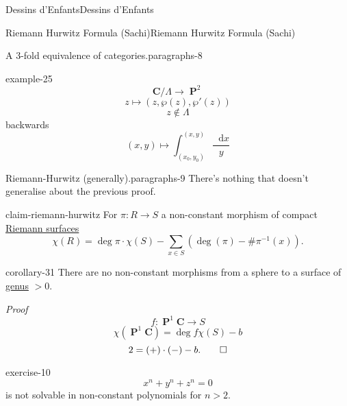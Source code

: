 \documentclass[10pt,]{book}
\makeatletter
\renewcommand*{\proofname}{Proof}
\renewenvironment{proof}[1][\proofname]{\par
  \pushQED{\qed}%
  \normalfont \topsep6\p@\@plus6\p@\relax
  \trivlist
  \item\relax
    {\itshape
    #1\@addpunct{.}}\hspace\labelsep\ignorespaces
}{%
  \popQED\endtrivlist\@endpefalse
}
\numberwithin{equation}{section}
\newcommand{\diff}{\mathop{}\!\mathrm{d}}
\newcommand{\inv}{^{-1}}
\newcommand{\CC}{\mathbf{C}}
\DeclareMathOperator{\PP}{\mathbf{P}}
\newcommand{\gt}{>}
\makeatother
\begin{document}
\begin{chapterptx}{Dessins d'Enfants}{}{Dessins d'Enfants}{}{}
\begin{sectionptx}{Riemann Hurwitz Formula (Sachi)}{}{Riemann Hurwitz Formula (Sachi)}{}{}
\begin{paragraphs}{A 3-fold equivalence of categories.}{paragraphs-8}
\begin{example}{}{example-25}
\begin{equation*}
\CC/\Lambda \to \PP^2
\end{equation*}
%
\begin{equation*}
z\mapsto (z,\wp(z), \wp'(z))
\end{equation*}
%
\begin{equation*}
z\not\in \Lambda
\end{equation*}
backwards%
\begin{equation*}
(x,y) \mapsto \int_{(x_0, y_0)}^{(x,y)} \frac{\diff x}{y}
\end{equation*}
%
\end{example}
\end{paragraphs}%
\begin{paragraphs}{Riemann-Hurwitz (generally).}{paragraphs-9}%
\hypertarget{p-531}{}%
There's nothing that doesn't generalise about the previous proof.%
\begin{claim}{}{}{claim-riemann-hurwitz}%
\hypertarget{p-532}{}%
For \(\pi\colon R\to S\) a non-constant morphism of compact \hyperref[def-top-riem-surface]{Riemann surfaces}%
\begin{equation*}
\chi(R) = \deg \pi \cdot \chi(S)  - \sum_{x\in S} (\deg(\pi) - \#\pi\inv(x))\text{.}
\end{equation*}
%
\end{claim}
\begin{corollary}{}{}{corollary-31}%
\hypertarget{p-533}{}%
There are no non-constant morphisms from a sphere to a surface of \hyperref[def-class-set]{genus} \(\gt 0\).%
\end{corollary}
\begin{proof}\hypertarget{proof-85}{}
\hypertarget{p-534}{}%
%
\begin{equation*}
f\colon \PP^1 \CC \to S
\end{equation*}
%
\begin{equation*}
\chi(\PP^1 \CC) = \deg f \chi(S) - b
\end{equation*}
%
\begin{equation*}
2 = (+)\cdot (-) - b\text{.}\qedhere
\end{equation*}
%
\end{proof}
\begin{inlineexercise}{}{exercise-10}%
\hypertarget{p-535}{}%
%
\begin{equation*}
x^n  +y^ n + z^n = 0
\end{equation*}
is not solvable in non-constant polynomials for \(n \gt 2\).%
\end{inlineexercise}

\end{paragraphs}
\end{sectionptx}
\end{chapterptx}
\end{document}
